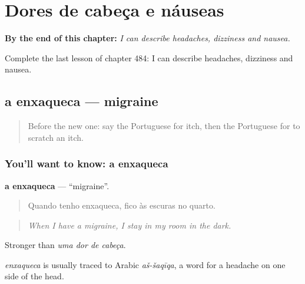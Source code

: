 
\chapter{Dores de cabeça e náuseas}
\label{ch:pt-dores-de-cabeca-e-nauseas}

\begin{chapteropening}
\textbf{By the end of this chapter:} \emph{I can describe headaches, dizziness and nausea.}

Complete the last lesson of chapter 484: I can describe headaches, dizziness and nausea.
\end{chapteropening}

\section[a enxaqueca]{a enxaqueca — migraine}

\label{lesson:PT-C484-enxaqueca}



\begin{quote}
Before the new one: say the Portuguese for itch, then the Portuguese for to scratch an itch.
\end{quote}

\subsection*{You'll want to know: a enxaqueca}
\textbf{a enxaqueca} — \textquotedblleft{}migraine\textquotedblright{}.

\begin{quote}
Quando tenho enxaqueca, fico às escuras no quarto.
\end{quote}

\begin{quote}
\emph{When I have a migraine, I stay in my room in the dark.}
\end{quote}

Stronger than \emph{uma dor de cabeça}.

\begin{cousinweb}
\emph{enxaqueca} is usually traced to Arabic \emph{aš-šaqīqa}, a word for a headache on one side of the head.
\end{cousinweb}


